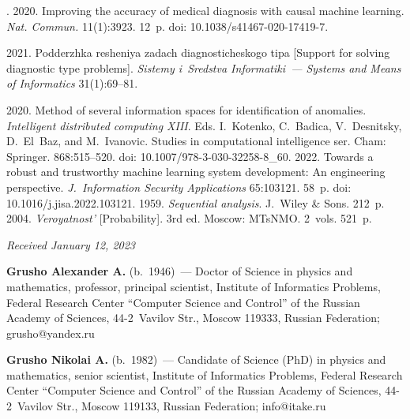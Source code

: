 \begin{multicols}{2}
{{\begin{thebibliography}{99}
. 2020. Improving the accuracy of medical diagnosis 
with causal machine learning. \textit{Nat. Commun.} 11(1):3923. 12~p. doi:  
10.1038/s41467-020-17419-7.

 2021. Podderzhka 
resheniya zadach diagnosticheskogo tipa [Support for solving diagnostic type problems]. 
\textit{Sistemy i~Sredstva Informatiki~--- Systems and Means of Informatics} 31(1):69--81.

 2020. Method of several information spaces for 
identification of anomalies. \textit{Intelligent distributed computing XIII}. Eds. I.~Kotenko, 
C.~Badica, V.~Desnitsky, D.~El~Baz, and M.~Ivanovic. Studies in computational intelligence ser. 
Cham: Springer. 868:515--520. doi: 10.1007/978-3-030-32258-8\_60. 
 2022. 
Towards a robust and trustworthy machine learning system development: An engineering perspective. 
\textit{J.~Information Security Applications} 65:103121. 58~p. doi: 10.1016/j.jisa.2022.103121.
 1959. \textit{Sequential analysis}. J.~Wiley \& Sons. 212~p. 
 2004. \textit{Veroyatnost'} [Probability]. 3rd ed. Moscow: MTsNMO. 2~vols. 521~p.
 \end{thebibliography}

 }
 }

\end{multicols}

\vspace*{-6pt}

\hfill{\small\textit{Received January 12, 2023}}

\Contr

\noindent
\textbf{Grusho Alexander A.} (b.\ 1946)~--- Doctor of Science in physics and mathematics, professor, 
principal scientist, Institute of Informatics Problems, Federal Research Center ``Computer Science and 
Control'' of the Russian Academy of Sciences, 44-2~Vavilov Str., Moscow 119333, Russian 
Federation; \mbox{grusho@yandex.ru}

\vspace*{3pt}

\noindent
\textbf{Grusho Nikolai A.} (b.\ 1982)~--- Candidate of Science (PhD) in physics and mathematics, 
senior scientist, Institute of Informatics Problems, Federal Research Center ``Computer Science and 
Control'' of the Russian Academy of Sciences, 44-2~Vavilov Str., Moscow 119133, Russian 
Federation; \mbox{info@itake.ru}

